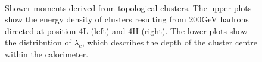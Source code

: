 \begin{figure}[!htb]
\begin{centering}
\\
\caption{Shower moments derived from topological clusters. The upper plots show the energy density of clusters resulting from 200GeV hadrons directed at position 4L (left) and 4H (right). The lower plots show the distribution of $\lambda_c$, which describes the depth of the cluster centre within the calorimeter.} 
\label{LC_moments_hadrons}
\end{centering}
\end{figure}



 








 







